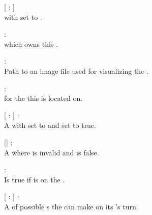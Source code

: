 \begin{dlist}
  \item {}[  :  ]\\
   with  set to .
  
  \item {} : \\
   which owns this .
  
  \item {} : \\
  Path to an image file used for visualizing the .
  
  \item {} : \\
   for the  this  is located on.
  
  \item {}[  :  ] : \\
  A  with  set to  and  set to true.
  
  \item {}[] : \\
  A  where  is invalid and  is false.
  
  \item {} : \\
  Is true if  is on the .
  
  \item {}[  :  ] : \\
  A  of possible s the  can make on its 's turn.
\end{dlist}


